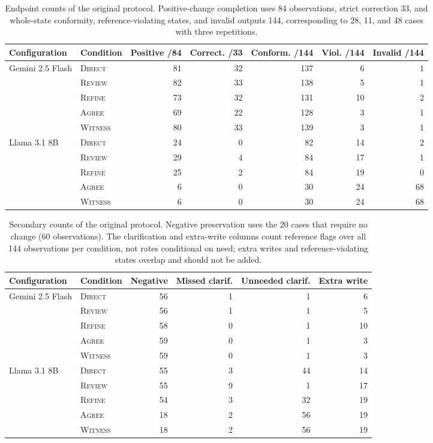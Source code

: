\documentclass[acmsmall,review]{acmart}
\newcommand{\agree}{\textsc{Agree}}
\newcommand{\witness}{\textsc{Witness}}
\newcommand{\review}{\textsc{Review}}
\newcommand{\direct}{\textsc{Direct}}
\newcommand{\refine}{\textsc{Refine}}
\begin{document}
\begin{table}[H]
\centering
\caption{Endpoint counts of the original protocol. Positive-change completion uses 84 observations, strict correction 33, and whole-state conformity, reference-violating states, and invalid outputs 144, corresponding to 28, 11, and 48 cases with three repetitions.}\label{tab:A1}
\small
\setlength{\tabcolsep}{3pt}
\begin{tabular}{@{}llrrrrr@{}}
\toprule
\textbf{Configuration} & \textbf{Condition} & \textbf{Positive /84} & \textbf{Correct. /33} & \textbf{Conform. /144} & \textbf{Viol. /144} & \textbf{Invalid /144} \\
\midrule
Gemini 2.5 Flash & \direct{} & 81 & 32 & 137 & 6 & 1 \\
 & \review{} & 82 & 33 & 138 & 5 & 1 \\
 & \refine{} & 73 & 32 & 131 & 10 & 2 \\
 & \agree{} & 69 & 22 & 128 & 3 & 1 \\
 & \witness{} & 80 & 33 & 139 & 3 & 1 \\
\addlinespace[2pt]
Llama 3.1 8B & \direct{} & 24 & 0 & 82 & 14 & 2 \\
 & \review{} & 29 & 4 & 84 & 17 & 1 \\
 & \refine{} & 25 & 2 & 84 & 19 & 0 \\
 & \agree{} & 6 & 0 & 30 & 24 & 68 \\
 & \witness{} & 6 & 0 & 30 & 24 & 68 \\
\bottomrule
\end{tabular}
\end{table}

\begin{table}[H]
\centering
\caption{Secondary counts of the original protocol. Negative preservation uses the 20 cases that require no change (60 observations). The clarification and extra-write columns count reference flags over all 144 observations per condition, not rates conditional on need; extra writes and reference-violating states overlap and should not be added.}\label{tab:A2}
\small
\setlength{\tabcolsep}{4pt}
\begin{tabular}{@{}llrrrr@{}}
\toprule
\textbf{Configuration} & \textbf{Condition} & \textbf{Negative} & \textbf{Missed clarif.} & \textbf{Unneeded clarif.} & \textbf{Extra write} \\
\midrule
Gemini 2.5 Flash & \direct{} & 56 & 1 & 1 & 6 \\
 & \review{} & 56 & 1 & 1 & 5 \\
 & \refine{} & 58 & 0 & 1 & 10 \\
 & \agree{} & 59 & 0 & 1 & 3 \\
 & \witness{} & 59 & 0 & 1 & 3 \\
\addlinespace[2pt]
Llama 3.1 8B & \direct{} & 55 & 3 & 44 & 14 \\
 & \review{} & 55 & 9 & 1 & 17 \\
 & \refine{} & 54 & 3 & 32 & 19 \\
 & \agree{} & 18 & 2 & 56 & 19 \\
 & \witness{} & 18 & 2 & 56 & 19 \\
\bottomrule
\end{tabular}
\end{table}
\end{document}
